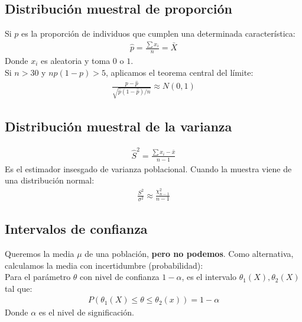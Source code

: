 \documentclass{article}
\begin{document}
\subsection{Distribución muestral de proporción}
Si $p$ es la proporción de individuos que cumplen una determinada característica:
\begin{equation}
    \begin{split}
        \hat{p}= \frac{\sum x_{i}}{n} = \bar{X}
    \end{split}
\end{equation}
Donde $x_{i}$ es aleatoria y toma $0$ o $1$.\\
Si $n>30$ y $np(1-p)>5$, aplicamos el teorema central del límite:
\begin{equation}
    \begin{split}
        \frac{p-\hat{p}}{\sqrt{\hat{p}(1-\hat{p}) / n}} \approx N(0,1)
    \end{split}
\end{equation}
\subsection{Distribución muestral de la varianza}
\begin{equation}
    \begin{split}
        \hat{S}^{2} = \frac{\sum x_{i} -\bar{x}}{n-1}
    \end{split}
\end{equation}
Es el estimador insesgado de varianza poblacional. Cuando la muestra viene de una distribución
normal:
\begin{equation}\tag*{Lema de Fisher-Cochran}
    \begin{split}
        \frac{S^{2}}{\sigma^{2}} \approx \frac{\chi^{2}_{n-1}}{n-1}
    \end{split}
\end{equation}
\subsection{Intervalos de confianza}
Queremos la media $\mu $ de una población, \textbf{pero no podemos}. Como alternativa,
calculamos la media con incertidumbre (probabilidad):\\
Para el parámetro $\theta $ con nivel de confianza $1-\alpha $, es el intervalo
$\theta_{1}(X), \theta _{2} (X)$ tal que:
\begin{equation}
    \begin{split}
        P(\theta _{1}(X) \leq \theta \leq \theta _{2}(x)) = 1-\alpha 
    \end{split}
\end{equation}
Donde $\alpha $ es el nivel de significación.
\end{document}
